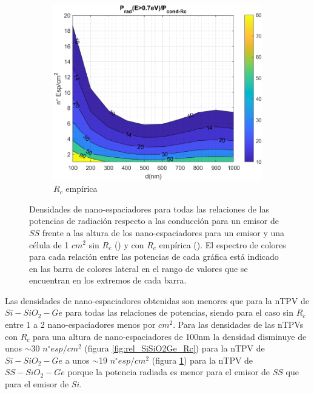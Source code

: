 \begin{figure}[H]
\begin{subfigure}[b]{0.49\textwidth}
			\includegraphics[width=1.00\textwidth]{figuras/Resultados/RelacionCondRad/SS_Rc_empirico.png}
		\caption{$R_c$ empírica}
		\label{fig:rel_SsSiO2Ge_Rc_emp}
	\end{subfigure}
	\caption{Densidades de nano-espaciadores para todas las relaciones de las potencias de radiación respecto a las conducción para un emisor de $SS$ frente a las altura de los nano-espaciadores para un emisor y una célula de 1 $cm^2$ sin $R_c$ () y con $R_c$ empírica (). El espectro de colores para cada relación entre las potencias de cada gráfica está indicado en las barra de colores lateral en el rango de valores que se encuentran en los extremos de cada barra.}
	\label{fig:rels_SsSiO2Ge_PnvsRc}
\end{figure}
Las densidades de nano-espaciadores obtenidas son menores que para la nTPV de $Si-SiO_2-Ge$ para todas las relaciones de potencias, siendo para el caso sin $R_c$ entre 1 a 2 nano-espaciadores menos por $cm^2$. Para las densidades de las nTPVs con $R_c$ para una altura de nano-espaciadores de 100nm la densidad disminuye de unos $\sim$30 $n^{\circ} esp/cm^2$ (figura \ref{fig:rel_SiSiO2Ge_Rc}) para la nTPV de $Si-SiO_2-Ge$ a unos $\sim$19 $n^{\circ} esp/cm^2$ (figura \ref{fig:rel_SsSiO2Ge_Rc_emp}) para la nTPV de $SS-SiO_2-Ge$ porque la potencia radiada es menor para el emisor de $SS$ que para el emisor de $Si$.
